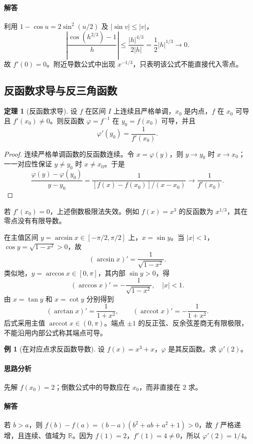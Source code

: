 \documentclass[UTF8,fontset=fandol,12pt,oneside,openany]{ctexrep}
\newcommand{\R}{\mathbb R}
\theoremstyle{definition}
\newtheorem{theorem}{定理}[chapter]
\newtheorem{example}{例}[chapter]
\begin{document}
\paragraph{解答}利用 $1-\cos u=2\sin^2(u/2)$ 及 $|\sin v|\le|v|$，
\[
 \left|\frac{\cos(h^{2/3})-1}h\right|
 \le\frac{|h|^{4/3}}{2|h|}=\frac12|h|^{1/3}\to0.
\]
故 $f'(0)=0$。附近导数公式中出现 $x^{-1/3}$，只表明该公式不能直接代入零点。

\subsection{反函数求导与反三角函数}
\label{lec:05:inverse}
\begin{theorem}[反函数求导]
设 $f$ 在区间 $I$ 上连续且严格单调，$x_0$ 是内点，$f$ 在 $x_0$ 可导且 $f'(x_0)\ne0$。则反函数 $\varphi=f^{-1}$ 在 $y_0=f(x_0)$ 可导，并且
\[
 \varphi'(y_0)=\frac1{f'(x_0)}.
\]
\end{theorem}
\begin{proof}
连续严格单调函数的反函数连续。令 $x=\varphi(y)$，则 $y\to y_0$ 时 $x\to x_0$；一一对应性保证 $y\ne y_0$ 时 $x\ne x_0$。于是
\[
 \frac{\varphi(y)-\varphi(y_0)}{y-y_0}
 =\frac1{[f(x)-f(x_0)]/(x-x_0)}\longrightarrow\frac1{f'(x_0)}.
\]
\end{proof}

若 $f'(x_0)=0$，上述倒数极限法失效。例如 $f(x)=x^3$ 的反函数为 $x^{1/3}$，其在零点没有有限导数。

在主值区间 $y=\arcsin x\in[-\pi/2,\pi/2]$ 上，$x=\sin y$。当 $|x|<1$，$\cos y=\sqrt{1-x^2}>0$，故
\[
 (\arcsin x)'=\frac1{\sqrt{1-x^2}}.
\]
类似地，$y=\arccos x\in[0,\pi]$，其内部 $\sin y>0$，得
\[
 (\arccos x)'=-\frac1{\sqrt{1-x^2}},\quad |x|<1.
\]
由 $x=\tan y$ 和 $x=\cot y$ 分别得到
\[
 (\arctan x)'=\frac1{1+x^2},\qquad
 (\operatorname{arccot}x)'=-\frac1{1+x^2}.
\]
后式采用主值 $\operatorname{arccot}x\in(0,\pi)$。端点 $\pm1$ 的反正弦、反余弦差商无有限极限，不能沿用内部公式称其端点可导。

\begin{example}[在对应点求反函数导数]
设 $f(x)=x^3+x$，$\varphi$ 是其反函数。求 $\varphi'(2)$。
\end{example}
\paragraph{思路分析}先解 $f(x_0)=2$；倒数公式中的导数应在 $x_0$，而非直接在 $2$ 求。
\paragraph{解答}若 $b>a$，则
$f(b)-f(a)=(b-a)(b^2+ab+a^2+1)>0$，故 $f$ 严格递增，且连续、值域为 $\R$。因为 $f(1)=2$，$f'(1)=4\ne0$，所以 $\varphi'(2)=1/4$。
\end{document}
